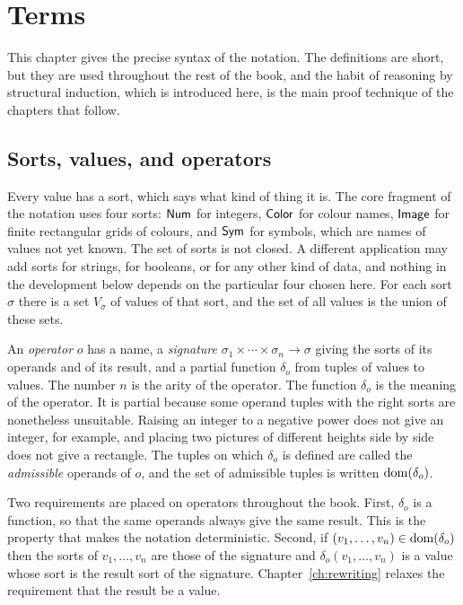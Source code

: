 \chapter{Terms}
\label{ch:terms}

This chapter gives the precise syntax of the notation. The definitions are short, but they are used throughout the rest of the book, and the habit of reasoning by structural induction, which is introduced here, is the main proof technique of the chapters that follow.

\section{Sorts, values, and operators}

Every value has a sort, which says what kind of thing it is. The core fragment of the notation uses four sorts: $\mathsf{Num}$ for integers, $\mathsf{Color}$ for colour names, $\mathsf{Image}$ for finite rectangular grids of colours, and $\mathsf{Sym}$ for symbols, which are names of values not yet known. The set of sorts is not closed. A different application may add sorts for strings, for booleans, or for any other kind of data, and nothing in the development below depends on the particular four chosen here. For each sort $\sigma$ there is a set $V_\sigma$ of values of that sort, and the set of all values is the union of these sets.

An \emph{operator} $o$ has a name, a \emph{signature} $\sigma_1 \times \cdots \times \sigma_n \to \sigma$ giving the sorts of its operands and of its result, and a partial function $\delta_o$ from tuples of values to values. The number $n$ is the arity of the operator. The function $\delta_o$ is the meaning of the operator. It is partial because some operand tuples with the right sorts are nonetheless unsuitable. Raising an integer to a negative power does not give an integer, for example, and placing two pictures of different heights side by side does not give a rectangle. The tuples on which $\delta_o$ is defined are called the \emph{admissible} operands of $o$, and the set of admissible tuples is written $\operatorname{dom}(\delta_o)$.

Two requirements are placed on operators throughout the book. First, $\delta_o$ is a function, so that the same operands always give the same result. This is the property that makes the notation deterministic. Second, if $(v_1,\dots,v_n)\in\operatorname{dom}(\delta_o)$ then the sorts of $v_1,\dots,v_n$ are those of the signature and $\delta_o(v_1,\dots,v_n)$ is a value whose sort is the result sort of the signature. Chapter~\ref{ch:rewriting} relaxes the requirement that the result be a value.


